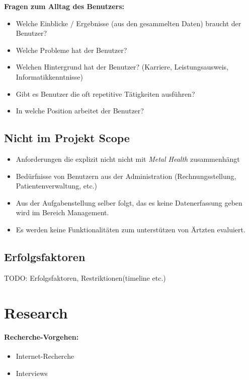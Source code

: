 \documentclass[a4paper]{scrreprt}
\begin{document}
\textbf{Fragen zum Alltag des Benutzers:}

\begin{itemize}
\item Welche Einblicke / Ergebnisse (aus den gesammelten Daten) braucht der Benutzer?
\item Welche Probleme hat der Benutzer?
\item Welchen Hintergrund hat der Benutzer? (Karriere, Leistungsausweis, Informatikkenntnisse)
\item Gibt es Benutzer die oft repetitive Tätigkeiten ausführen?
\item In welche Position arbeitet der Benutzer?
\end{itemize}

\subsection{Nicht im Projekt Scope}

\begin{itemize}
\item Anforderungen die explizit nicht nicht mit \textit{Metal Health} zusammenhängt
\item Bedürfnisse von Benutzern aus der Administration (Rechnungsstellung, Patientenverwaltung, etc.)
\item Aus der Aufgabenstellung selber folgt, das es keine Datenerfassung geben wird im Bereich Management.
\item Es werden keine Funktionalitäten zum unterstützen von Ärtzten evaluiert. 
\end{itemize} 

\subsection{Erfolgsfaktoren}


TODO: Erfolgsfaktoren, Restriktionen(timeline etc.)

\section{Research}
\paragraph{Recherche-Vorgehen:} 
\begin{itemize}
\item Internet-Recherche
\item Interviews
\end{itemize}
\end{document}
